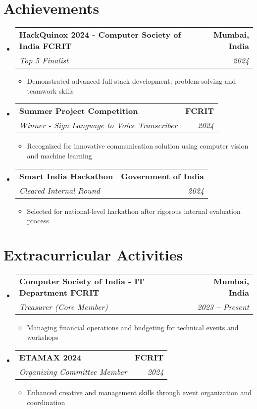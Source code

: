 \documentclass[letterpaper,11pt]{article}
\makeatletter
\newcommand{\resumeItem}[1]{
  \item\small{
    {#1 \vspace{-2pt}}
  }
}
\newcommand{\resumeSubheading}[4]{
  \vspace{-2pt}\item
    \begin{tabular*}{1.0\textwidth}[t]{l@{\extracolsep{\fill}}r}
      \textbf{#1} & \textbf{\small #2} \\
      \textit{\small#3} & \textit{\small #4} \\
    \end{tabular*}\vspace{-7pt}
}
\newcommand{\resumeSubHeadingListStart}{\begin{itemize}[leftmargin=0.0in, label={}]}
\newcommand{\resumeSubHeadingListEnd}{\end{itemize}}
\newcommand{\resumeItemListStart}{\begin{itemize}}
\newcommand{\resumeItemListEnd}{\end{itemize}\vspace{-5pt}}
\makeatother
\begin{document}
\section{Achievements}
    \resumeSubHeadingListStart
      \resumeSubheading
        {HackQuinox 2024 - Computer Society of India FCRIT}{Mumbai, India}
        {Top 5 Finalist}{2024}
        \resumeItemListStart
          \resumeItem{Demonstrated advanced full-stack development, problem-solving and teamwork skills}
        \resumeItemListEnd
      \resumeSubheading
        {Summer Project Competition}{FCRIT}
        {Winner - Sign Language to Voice Transcriber}{2024}
        \resumeItemListStart
          \resumeItem{Recognized for innovative communication solution using computer vision and machine learning}
        \resumeItemListEnd
      \resumeSubheading
        {Smart India Hackathon}{Government of India}
        {Cleared Internal Round}{2024}
        \resumeItemListStart
          \resumeItem{Selected for national-level hackathon after rigorous internal evaluation process}
        \resumeItemListEnd
    \resumeSubHeadingListEnd

\section{Extracurricular Activities}
    \resumeSubHeadingListStart
      \resumeSubheading
        {Computer Society of India - IT Department FCRIT}{Mumbai, India}
        {Treasurer (Core Member)}{2023 -- Present}
        \resumeItemListStart
          \resumeItem{Managing financial operations and budgeting for technical events and workshops}
        \resumeItemListEnd
      \resumeSubheading
        {ETAMAX 2024}{FCRIT}
        {Organizing Committee Member}{2024}
        \resumeItemListStart
          \resumeItem{Enhanced creative and management skills through event organization and coordination}
        \resumeItemListEnd
    \resumeSubHeadingListEnd
\end{document}
